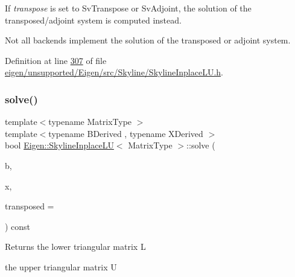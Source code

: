 If {\itshape transpose} is set to Sv\+Transpose or Sv\+Adjoint, the solution of the transposed/adjoint system is computed instead.

Not all backends implement the solution of the transposed or adjoint system. 

Definition at line \hyperlink{eigen_2unsupported_2_eigen_2src_2_skyline_2_skyline_inplace_l_u_8h_source_l00307}{307} of file \hyperlink{eigen_2unsupported_2_eigen_2src_2_skyline_2_skyline_inplace_l_u_8h_source}{eigen/unsupported/\+Eigen/src/\+Skyline/\+Skyline\+Inplace\+L\+U.\+h}.

\mbox{\label{class_eigen_1_1_skyline_inplace_l_u_a53c846d76559221d2bcf336a2da4d68f}} 
\subsubsection{\texorpdfstring{solve()}{solve()}\hspace{0.1cm}{\footnotesize\ttfamily [2/2]}}
{\footnotesize\ttfamily template$<$typename Matrix\+Type $>$ \\
template$<$typename B\+Derived , typename X\+Derived $>$ \\
bool \hyperlink{class_eigen_1_1_skyline_inplace_l_u}{Eigen\+::\+Skyline\+Inplace\+LU}$<$ Matrix\+Type $>$\+::solve (\begin{DoxyParamCaption}\item[{const \hyperlink{group___core___module_class_eigen_1_1_matrix_base}{Matrix\+Base}$<$ B\+Derived $>$ \&}]{b,  }\item[{\hyperlink{group___core___module_class_eigen_1_1_matrix_base}{Matrix\+Base}$<$ X\+Derived $>$ $\ast$}]{x,  }\item[{const int}]{transposed = {} }\end{DoxyParamCaption}) const}

\begin{DoxyReturn}{Returns}
the lower triangular matrix L 

the upper triangular matrix U 
\end{DoxyReturn}
\mbox{\label{class_eigen_1_1_skyline_inplace_l_u_abd633c27a0a342fb392b6af3ceb800ba}} 
